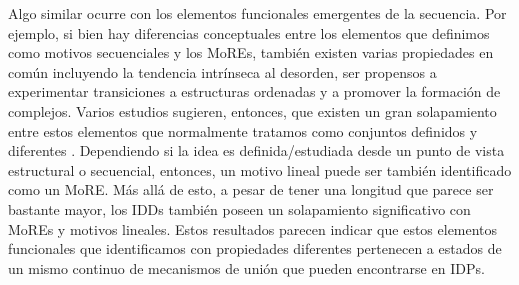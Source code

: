 % 
Algo similar ocurre con los elementos funcionales emergentes de la secuencia.
Por ejemplo, si bien hay diferencias conceptuales entre los elementos que definimos como motivos secuenciales y los MoREs, 
también existen varias propiedades en común incluyendo la tendencia intrínseca al desorden, ser propensos a experimentar transiciones a estructuras ordenadas y a promover la formación de complejos. 
Varios estudios sugieren, entonces, que existen un gran solapamiento entre estos elementos que normalmente tratamos como conjuntos definidos y diferentes \cite{fuxreiter2007local,meszaros2012disordered}.
Dependiendo si la idea es definida/estudiada desde un punto de vista estructural o secuencial, entonces, un motivo lineal puede ser también identificado como un MoRE.
Más allá de esto, a pesar de tener una longitud que parece ser bastante mayor, los IDDs también poseen un solapamiento significativo con MoREs y motivos lineales.
Estos resultados parecen indicar que estos elementos funcionales que identificamos con propiedades diferentes pertenecen a estados de un mismo continuo de mecanismos de unión que pueden encontrarse en IDPs.



